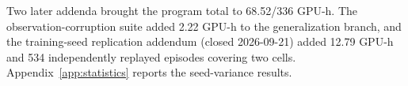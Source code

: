 Two later addenda brought the program total to 68.52/336 GPU-h. The observation-corruption suite added 2.22 GPU-h to the generalization branch, and the training-seed replication addendum (closed 2026-09-21) added 12.79 GPU-h and 534 independently replayed episodes covering two cells. Appendix~\ref{app:statistics} reports the seed-variance results.

